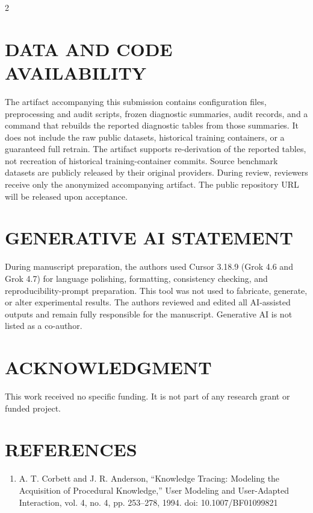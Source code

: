 \documentclass[10pt,a4paper]{article}
\begin{document}
\begin{multicols}{2}
\section*{\MakeUppercase{Data and Code Availability}}

The artifact accompanying this submission contains configuration files, preprocessing and audit scripts, frozen diagnostic summaries, audit records, and a command that rebuilds the reported diagnostic tables from those summaries. It does not include the raw public datasets, historical training containers, or a guaranteed full retrain. The artifact supports re-derivation of the reported tables, not recreation of historical training-container commits. Source benchmark datasets are publicly released by their original providers. During review, reviewers receive only the anonymized accompanying artifact. The public repository URL will be released upon acceptance.

\section*{\MakeUppercase{Generative AI Statement}}

During manuscript preparation, the authors used Cursor 3.18.9 (Grok 4.6 and Grok 4.7) for language polishing, formatting, consistency checking, and reproducibility-prompt preparation. This tool was not used to fabricate, generate, or alter experimental results. The authors reviewed and edited all AI-assisted outputs and remain fully responsible for the manuscript. Generative AI is not listed as a co-author.

\vspace{55pt}
\section*{\MakeUppercase{Acknowledgment}}

This work received no specific funding. It is not part of any research grant or funded project.

\section*{\MakeUppercase{References}}

{\fontsize{8}{8.0}\selectfont
\begin{enumerate}
\setlength{\itemsep}{0pt}
\setlength{\parsep}{0pt}
\setlength{\topsep}{2pt}
\renewcommand{\labelenumi}{[\theenumi]}
\item A. T. Corbett and J. R. Anderson, ``Knowledge Tracing: Modeling the Acquisition of Procedural Knowledge,'' User Modeling and User-Adapted Interaction, vol. 4, no. 4, pp. 253--278, 1994. doi: 10.1007/BF01099821


\end{enumerate}}
\end{multicols}
\end{document}
